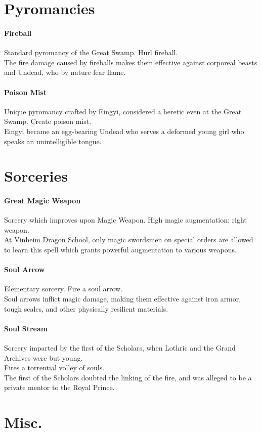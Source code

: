 \documentclass[twocolumn,a4paper]{article}
\begin{document}
\section*{Pyromancies}
\paragraph{Fireball}
Standard pyromancy of the Great Swamp. Hurl fireball.\\
The fire damage caused by fireballs makes them effective against corporeal beasts and Undead, who by nature fear flame.
\paragraph{Poison Mist}
Unique pyromancy crafted by Eingyi, considered a heretic even at the Great Swamp. Create poison mist.\\
Eingyi became an egg-bearing Undead who serves a deformed young girl who speaks an unintelligible tongue.
\section*{Sorceries}
\paragraph{Great Magic Weapon}
Sorcery which improves upon Magic Weapon. High magic augmentation: right weapon.\\
At Vinheim Dragon School, only magic swordsmen on special orders are allowed to learn this spell which grants powerful augmentation to various weapons.
\paragraph{Soul Arrow}
Elementary sorcery. Fire a soul arrow.\\
Soul arrows inflict magic damage, making them effective against iron armor, tough scales, and other physically resilient materials.
\paragraph{Soul Stream}
Sorcery imparted by the first of the Scholars, when Lothric and the Grand Archives were but young.\\
Fires a torrential volley of souls.\\
The first of the Scholars doubted the linking of the fire, and was alleged to be a private mentor to the Royal Prince.
\section*{Misc.}
\end{document}
